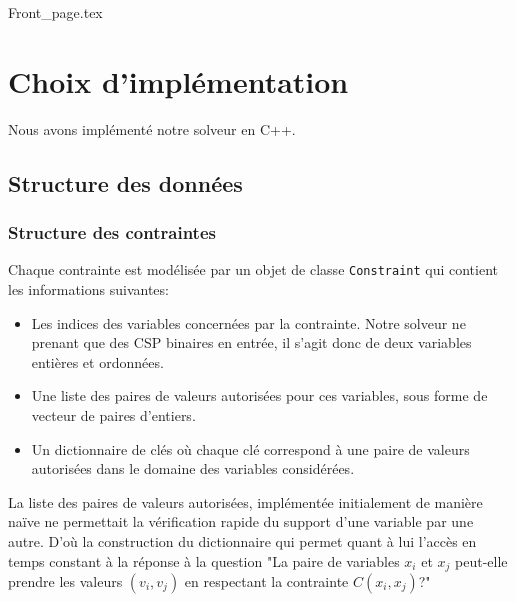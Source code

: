 \documentclass[14pt]{article}
\begin{document}
\renewcommand{\footrulewidth}{0.4pt}
\renewcommand{\headrulewidth}{0.4pt}

\vspace{0cm}              %


{Front_page.tex}

\clearpage
\thispagestyle{fancy}
\tableofcontents
\thispagestyle{fancy}      %

\clearpage

\section{Choix d'implémentation}

Nous avons implémenté notre solveur en C++.

\subsection{Structure des données}

\subsubsection{Structure des contraintes} \label{Structure des contraintes}
Chaque contrainte est modélisée par un objet de classe \texttt{Constraint} qui contient les informations suivantes:
\begin{itemize}
    \item Les indices des variables concernées par la contrainte. Notre solveur ne prenant que des CSP binaires en entrée, il s'agit donc de deux variables entières et ordonnées.
    \item Une liste des paires de valeurs autorisées pour ces variables, sous forme de vecteur de paires d'entiers.
    \item Un dictionnaire de clés où chaque clé correspond à une paire de valeurs autorisées dans le domaine des variables considérées.
\end{itemize}

La liste des paires de valeurs autorisées, implémentée initialement de manière naïve ne permettait la vérification rapide du support d'une variable par une autre. D'où la construction du dictionnaire qui permet quant à lui l'accès en temps constant à la réponse à la question "La paire de variables $x_i$ et $x_j$ peut-elle prendre les valeurs $(v_i,v_j)$ en respectant la contrainte $C(x_i,x_j)$?"
\end{document}
